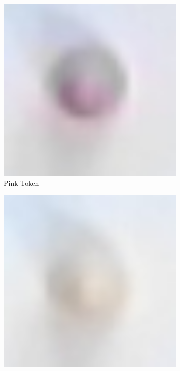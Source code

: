 \documentclass[12pt]{article}
\begin{document}
\begin{figure}[H]
\begin{subfigure}{0.2\textwidth}
        \includegraphics[width=1\textwidth]{images/figures/fig10b}
        \caption{Pink Token}
        \label{fig:tokencolorb}
    \end{subfigure}
    \begin{subfigure}{0.2\textwidth}
        \includegraphics[width=1\textwidth]{images/figures/fig10c}

\end{subfigure}
\end{figure}
\end{document}
